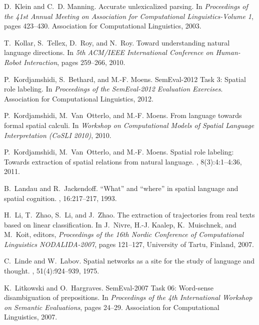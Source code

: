 \documentclass{acm_proc_article-sp}
\begin{document}
\begin{thebibliography}{10}
D.~Klein and C.~D. Manning.
\newblock Accurate unlexicalized parsing.
\newblock In {\em Proceedings of the 41st Annual Meeting on Association for
  Computational Linguistics-Volume 1}, pages 423--430. Association for
  Computational Linguistics, 2003.

T.~Kollar, S.~Tellex, D.~Roy, and N.~Roy.
\newblock Toward understanding natural language directions.
\newblock In {\em 5th ACM/IEEE International Conference on Human-Robot
  Interaction}, pages 259--266, 2010.

P.~Kordjamshidi, S.~Bethard, and M.-F. Moens.
\newblock Sem{E}val-2012 {T}ask 3: Spatial role labeling.
\newblock In {\em Proceedings of the {S}em{E}val-2012 Evaluation Exercises}.
  Association for Computational Linguistics, 2012.

P.~Kordjamshidi, M.~Van~Otterlo, and M.-F. Moens.
\newblock From language towards formal spatial calculi.
\newblock In {\em Workshop on Computational Models of Spatial Language
  Interpretation (CoSLI 2010)}, 2010.

P.~Kordjamshidi, M.~Van~Otterlo, and M.-F. Moens.
\newblock Spatial role labeling: Towards extraction of spatial relations from
  natural language.
,
  8(3):4:1--4:36, 2011.

B.~Landau and R.~Jackendoff.
\newblock ``{W}hat'' and ``where'' in spatial language and spatial cognition.
, 16:217--217, 1993.

H.~Li, T.~Zhao, S.~Li, and J.~Zhao.
\newblock The extraction of trajectories from real texts based on linear
  classification.
\newblock In J.~Nivre, H.-J. Kaalep, K.~Muischnek, and M.~Koit, editors, {\em
  Proceedings of the 16th Nordic Conference of Computational Linguistics
  NODALIDA-2007}, pages 121--127, University of Tartu, Finland, 2007.

C.~Linde and W.~Labov.
\newblock Spatial networks as a site for the study of language and thought.
, 51(4):924--939, 1975.

K.~Litkowski and O.~Hargraves.
\newblock Sem{E}val-2007 {T}ask 06: Word-sense disambiguation of prepositions.
\newblock In {\em Proceedings of the 4th International Workshop on Semantic
  Evaluations}, pages 24--29. Association for Computational Linguistics, 2007.


\end{thebibliography}
\end{document}
